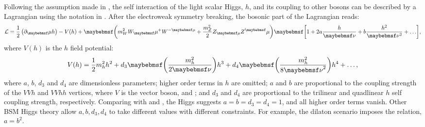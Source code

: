 Following the assumption made in  \cite{Contino:2010mh,Contino:2013gna}, the self interaction of the light scalar Higgs, $h$, and its coupling to other \SM bosons can be described by a Lagrangian using the notation in  \cite{Contino:2013gna}. After the electroweak symmetry breaking, the bosonic part of the Lagrangian reads:
\begin{equation}
\Lagr =\frac{1}{2}\left(\partial_\mu{h}\right)  - V(h) + \parenths{m_W^2{W}_\mu^+{W}^{-\mu} + \frac{m_Z^2}{2}Z_{\mu}Z^\mu}\sqbracs{1 + 2a\frac{h}{\nu} + b \frac{h^2}{\nu^2} + \hdots},
\end{equation}
where $V(h)$ is the $h$ field potential:
\begin{equation}
V(h) = \frac{1}{2}m_h^2h^2 + d_3\parenths{\frac{m_h^2}{2\nu}}h^3 + d_4\parenths{\frac{m_h^2}{8{\nu}^2}}h^4 + \hdots ,
\end{equation}
where $a$, $b$, $d_3$ and $d_4$ are  dimensionless parameters; higher order terms in $h$ are omitted; $a$ and $b$ are proportional to the coupling strength of the $VVh$ and $VVhh$ vertices, where $V$ is the vector boson, \PWpm and \PZ; and $d_3$ and $d_4$ are proportional to the trilinear and quadlinear $h$ self coupling strength, respectively. Comparing with  and , the \SM Higgs suggests $a=b=d_3=d_4=1$, and all higher order terms vanish. Other BSM Higgs theory allow $a,b,d_3,d_4$ to take different values with different constraints. For example, the dilaton scenario imposes the relation, $a = b^2$.

